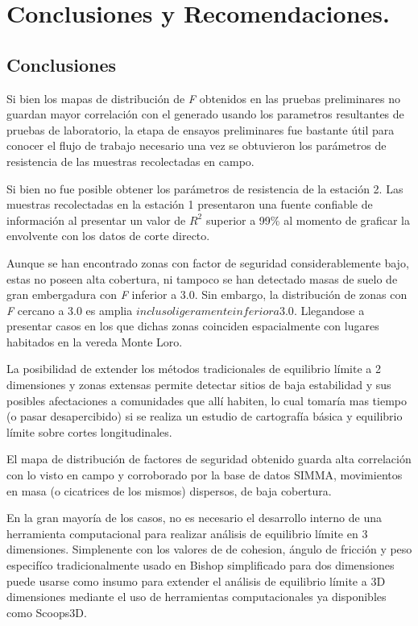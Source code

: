 

\chapter{Conclusiones y Recomendaciones.}

\section{Conclusiones}

Si bien los mapas de distribuci\'on de \textit{F} obtenidos en las pruebas preliminares no guardan mayor correlaci\'on con el generado usando los parametros resultantes de pruebas de laboratorio, la etapa de ensayos preliminares fue bastante \'util para conocer el flujo de trabajo necesario una vez se obtuvieron los par\'ametros de resistencia de las muestras recolectadas en campo.

Si bien no fue posible obtener los par\'ametros de resistencia de la estaci\'on 2. Las muestras recolectadas en la estaci\'on 1 presentaron  una  fuente confiable de informaci\'on al presentar un valor de $R^{2}$ superior a 99\% al momento de graficar la envolvente con los datos de corte directo.

Aunque se han encontrado zonas  con factor de seguridad  considerablemente bajo, estas no poseen alta cobertura, ni tampoco se han detectado masas de suelo de gran embergadura con \textit{F} inferior a 3.0. Sin embargo, la distribuci\'on de zonas con \textit{F} cercano a 3.0  es amplia \( incluso ligeramente inferior a 3.0 \). Llegandose a presentar casos en los que dichas zonas coinciden espacialmente con lugares habitados en la vereda Monte Loro.

La posibilidad de extender los m\'etodos tradicionales de equilibrio l\'imite a 2 dimensiones y zonas extensas permite detectar sitios de baja estabilidad y sus posibles afectaciones a comunidades que all\'i habiten, lo cual tomar\'ia mas tiempo (o pasar desapercibido) si se realiza un estudio de cartograf\'ia b\'asica y equilibrio l\'imite sobre cortes longitudinales.

El mapa de distribuci\'on de factores de seguridad obtenido guarda alta correlaci\'on con lo visto en campo y corroborado por la base de datos SIMMA, movimientos en masa (o cicatrices de los mismos) dispersos, de baja cobertura.

En la gran mayor\'ia de los casos, no es necesario el desarrollo interno de una herramienta computacional para realizar an\'alisis de equilibrio l\'imite en 3 dimensiones. Simplenente con los valores de de cohesion, \'angulo de fricci\'on y peso especif\'ico tradicionalmente usado en Bishop simplificado para dos dimensiones puede usarse como insumo para extender el an\'alisis  de equilibrio l\'imite a 3D dimensiones mediante el uso de herramientas computacionales ya disponibles como Scoops3D.

